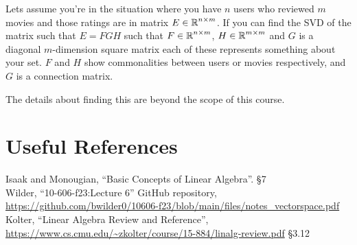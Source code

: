  Lets assume you're in the situation where you have $n$ users who reviewed $m$ movies and those ratings are in matrix $E\in\operatorname{\mathbb{R}}^{n\times m}$. 
 If you can find the SVD of the matrix such that $E=FGH$ such that $F\in\operatorname{\mathbb{R}}^{n\times m}$, $H\in\operatorname{\mathbb{R}}^{m\times m}$ and $G$ is a diagonal $m$-dimension square matrix each of these represents something about your set. 
 $F$ and $H$ show commonalities between users or movies respectively, 
 and $G$ is a connection matrix. 
 
 The details about finding this are beyond the scope of this course. 


\section*{Useful References}
Isaak and Monougian, ``Basic Concepts of Linear Algebra''. \S 7\\
Wilder, ``10-606-f23:Lecture 6'' GitHub repository, \url{https://github.com/bwilder0/10606-f23/blob/main/files/notes_vectorspace.pdf}\\
Kolter, ``Linear Algebra Review and Reference'', \url{https://www.cs.cmu.edu/~zkolter/course/15-884/linalg-review.pdf} \S 3.12

